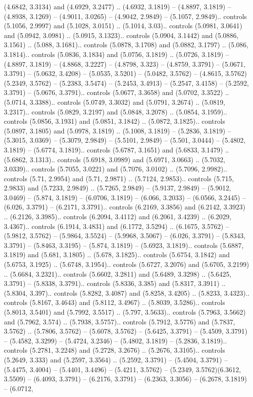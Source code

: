 (4.6842, 3.3134) and (4.6929, 3.2477) .. (4.6932, 3.1819) -- (4.8897, 3.1819) -- (4.8938, 3.1269) -- (4.9011, 3.0265) -- (4.9042, 2.9849) -- (5.1057, 2.9849).. controls (5.1056, 2.9997) and (5.1028, 3.0151) .. (5.1014, 3.03).. controls (5.0981, 3.0641) and (5.0942, 3.0981) .. (5.0915, 3.1323).. controls (5.0904, 3.1442) and (5.0886, 3.1561) .. (5.088, 3.1681).. controls (5.0878, 3.1708) and (5.0882, 3.1797) .. (5.086, 3.1814).. controls (5.0836, 3.1834) and (5.0756, 3.1819) .. (5.0726, 3.1819) -- (4.8897, 3.1819) -- (4.8868, 3.2227) -- (4.8798, 3.323) -- (4.8759, 3.3791) -- (5.0671, 3.3791) -- (5.0632, 3.4208) -- (5.0535, 3.5201) -- (5.0482, 3.5762) -- (4.8615, 3.5762)(5.2349, 3.5762) -- (5.2383, 3.5474) -- (5.2453, 3.4913) -- (5.2547, 3.4158) -- (5.2592, 3.3791) -- (5.0676, 3.3791).. controls (5.0677, 3.3658) and (5.0702, 3.3522) .. (5.0714, 3.3388).. controls (5.0749, 3.3032) and (5.0791, 3.2674) .. (5.0819, 3.2317).. controls (5.0829, 3.2197) and (5.0848, 3.2078) .. (5.0854, 3.1959).. controls (5.0856, 3.1931) and (5.0851, 3.1842) .. (5.0872, 3.1825).. controls (5.0897, 3.1805) and (5.0978, 3.1819) .. (5.1008, 3.1819) -- (5.2836, 3.1819) -- (5.3015, 3.0369) -- (5.3079, 2.9849) -- (5.5101, 2.9849) -- (5.501, 3.0444) -- (5.4802, 3.1819) -- (5.6774, 3.1819).. controls (5.6787, 3.1651) and (5.6833, 3.1479) .. (5.6862, 3.1313).. controls (5.6918, 3.0989) and (5.6971, 3.0663) .. (5.7032, 3.0339).. controls (5.7055, 3.0221) and (5.7076, 3.0102) .. (5.7096, 2.9982).. controls (5.71, 2.9954) and (5.71, 2.9871) .. (5.7124, 2.9853).. controls (5.715, 2.9833) and (5.7233, 2.9849) .. (5.7265, 2.9849) -- (5.9137, 2.9849) -- (5.9012, 3.0469) -- (5.874, 3.1819) -- (6.0706, 3.1819) -- (6.066, 3.2033) -- (6.0566, 3.2445) -- (6.026, 3.3791) -- (6.2171, 3.3791).. controls (6.2169, 3.3856) and (6.2142, 3.3923) .. (6.2126, 3.3985).. controls (6.2094, 3.4112) and (6.2061, 3.4239) .. (6.2029, 3.4367).. controls (6.1914, 3.4831) and (6.1772, 3.5294) .. (6.1675, 3.5762) -- (5.9812, 3.5762) -- (5.9864, 3.5524) -- (5.9968, 3.5067) -- (6.026, 3.3791) -- (5.8343, 3.3791) -- (5.8463, 3.3195) -- (5.874, 3.1819) -- (5.6923, 3.1819).. controls (5.6887, 3.1819) and (5.681, 3.1805) .. (5.678, 3.1825).. controls (5.6754, 3.1842) and (5.6753, 3.1925) .. (5.6748, 3.1954).. controls (5.6727, 3.2076) and (5.6705, 3.2199) .. (5.6684, 3.2321).. controls (5.6602, 3.2811) and (5.6489, 3.3298) .. (5.6425, 3.3791) -- (5.8338, 3.3791).. controls (5.8336, 3.385) and (5.8317, 3.3911) .. (5.8304, 3.397).. controls (5.8282, 3.4087) and (5.8258, 3.4205) .. (5.8233, 3.4323).. controls (5.8167, 3.4643) and (5.8112, 3.4967) .. (5.8039, 3.5286).. controls (5.8013, 3.5401) and (5.7992, 3.5517) .. (5.797, 3.5633).. controls (5.7963, 3.5662) and (5.7962, 3.574) .. (5.7938, 3.5757).. controls (5.7912, 3.5776) and (5.7837, 3.5762) .. (5.7806, 3.5762) -- (5.6078, 3.5762) -- (5.6425, 3.3791) -- (5.4509, 3.3791) -- (5.4582, 3.3299) -- (5.4724, 3.2346) -- (5.4802, 3.1819) -- (5.2836, 3.1819).. controls (5.2781, 3.2248) and (5.2728, 3.2676) .. (5.2676, 3.3105).. controls (5.2649, 3.333) and (5.2597, 3.3564) .. (5.2592, 3.3791) -- (5.4504, 3.3791) -- (5.4475, 3.4004) -- (5.4401, 3.4496) -- (5.4211, 3.5762) -- (5.2349, 3.5762)(6.3612, 3.5509) -- (6.4093, 3.3791) -- (6.2176, 3.3791) -- (6.2363, 3.3056) -- (6.2678, 3.1819) -- (6.0712, 